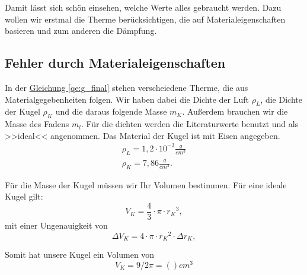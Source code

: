 Damit lässt sich schön einsehen, welche Werte alles gebraucht werden. Dazu wollen wir erstmal die Therme berücksichtigen, die auf Materialeigenschaften basieren und zum anderen die Dämpfung. 

\subsection{Fehler durch Materialeigenschaften}
In der \hyperref[qe:g_final]{Gleichung \ref*{qe:g_final}} stehen verscheiedene Therme, die aus Materialgegebenheiten folgen. Wir haben dabei die Dichte der Luft $\rho_L$, die Dichte der Kugel $\rho_K$ und die daraus folgende Masse $m_K$. Außerdem brauchen wir die Masse des Fadens $m_l$. Für die dichten werden die Literaturwerte benutzt und als >>ideal<< angenommen. Das Material der Kugel ist mit Eisen angegeben.
\begin{align}
    \rho_L = 1,2 \cdot 10^{-3} \frac{g}{cm^3} \\
    \rho_K = 7,86 \frac{g}{cm^3}.
\end{align}

Für die Masse der Kugel müssen wir Ihr Volumen bestimmen. Für eine ideale Kugel gilt:
\begin{equation}
    V_K = \frac{4}{3} \cdot \pi \cdot {r_K}^3,
\end{equation}
mit einer Ungenauigkeit von
\begin{equation}
    \Delta V_K = 4 \cdot \pi \cdot {r_K}^2 \cdot \Delta r_K,
\end{equation}

Somit hat unsere Kugel ein Volumen von
\begin{equation}
    V_K = 9/2 \pi = () cm^3
\end{equation}
